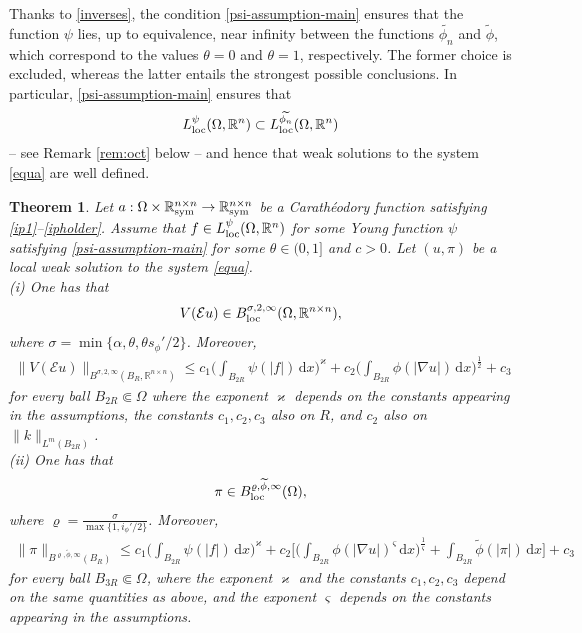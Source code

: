 \documentclass[leqno,11pt]{amsart}%
\numberwithin{equation}{section}
\def\real{\mathbb R}
\def\Rn{{\mathbb R}^{n}}
\def\d{\mathrm{d}}
\def\E{\mathcal{E}}
\def\dx{\d x}
\def\Sym{\real^{n\times n}_{\textup{sym}}}
\newtheorem{thm}{Theorem}[section]
\theoremstyle{definition}
\numberwithin{equation}{section}
\begin{document}
 Thanks to \eqref{inverses}, the condition \eqref{psi-assumption-main} ensures that the function $\psi$ lies, up to equivalence, near infinity between the functions $\widetilde {\phi_n}$ and $\widetilde \phi$, which correspond to the values $\theta =0$ and $\theta =1$, respectively.
The former choice is excluded, whereas the latter   entails the strongest possible conclusions.
In particular, \eqref{psi-assumption-main} ensures that 
\begin{align}\label{oct1}
    L^\psi_{\rm loc}(\Omega, \Rn) \subset L^{\widetilde {\phi_n}}_{\rm loc}(\Omega, \real^n)
\end{align}
 -- see Remark \ref{rem:oct} below -- and hence that 
weak solutions to the system \eqref{equa}
are well defined.
\begin{thm}
    \label{main}
   Let $a:\Omega\times\Sym\to\Sym$ be a Carath\'eodory function satisfying \eqref{ip1}--\eqref{ipholder}. 
   Assume that $f\in L^\psi_{\rm loc}(\Omega,\mathbb{R}^n)$ for some Young function
   $\psi$  satisfying \eqref{psi-assumption-main} for some  $\theta \in (0, 1]$ and $c>0$.
     Let $(u,\pi)$ be a local weak solution to the system \eqref{equa}. \\ (i) One has that
\begin{align}
    \label{reg-u}
    V(\mathcal E u)\in B^{\sigma, 2, \infty}
   _{\rm loc}(\Omega, \mathbb R^{n\times n}),
\end{align}
where $\sigma =  \min\big\{\alpha, \theta, \theta s_\phi'/2\big\}$. Moreover,
{\begin{align}
    \label{oct109}    \|V(\E u)\|_{B^{\sigma, 2, \infty}(B_R, \mathbb R^{n\times n})}
    \le  c_1 
\bigg(\int_{B_{2R}}\psi(|f|)\,\dx\bigg)^\varkappa
  + c_2
\bigg(\int_{B_{2R}}\phi(|\nabla u|)\,\dx\bigg)^{\frac12}
   +c_3
\end{align}}
for every ball $B_{2R} \Subset \Omega$
where the exponent $\varkappa$   depends on the constants appearing in the assumptions, the constants $c_1, c_2, c_3$
also on $R$, and $c_2$ also on  
$\|k\|_{L^m(B_{2R})}$.
\\
(ii) 
One has that
\begin{align}
    \label{reg-pi}
    \pi\in  B^{\varrho, \widetilde \phi, \infty}
   _{\rm loc}(\Omega),
\end{align}
where  $ \displaystyle\varrho =\frac{\sigma}{\max\{1, i_\phi'/2\}}$.
Moreover,
{\begin{align}
    \label{boundpi}
\|\pi\|_{ B^{\varrho, \widetilde \phi, \infty}(B_R)}
    \le
 c_1 
\bigg(\int_{B_{2R}}\psi(|f|)\,\dx\bigg)^\varkappa  +
c_2 \Bigg[\bigg(\int_{B_{2R}}\phi(|\nabla u|)^\varsigma\,\dx\bigg)^{\frac 1\varsigma} 
 + \int_{B_{2R}}\widetilde\phi(|\pi|)\,\dx\Bigg]
   +c_3
\end{align}}
for every ball $B_{3R} \Subset \Omega$,
where the exponent $\varkappa$ and the constants $c_1, c_2, c_3$ depend on the same quantities as above, and the exponent  
$\varsigma$ depends 
 on the constants appearing in the assumptions.
\end{thm}
\end{document}
